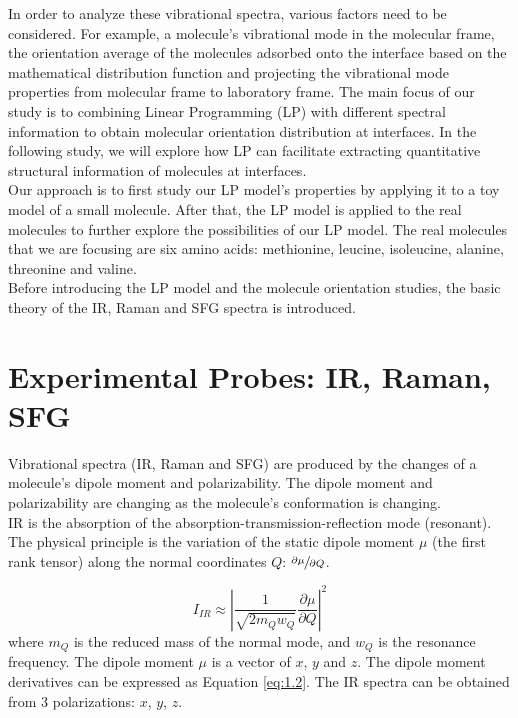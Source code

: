 In order to analyze these vibrational spectra, various factors need to be considered. For example, a molecule's vibrational mode in the molecular frame, the orientation average of the molecules adsorbed onto the interface based on the mathematical distribution function and projecting the vibrational mode properties from molecular frame to laboratory frame. The main focus of our study is to combining Linear Programming (LP) with different spectral information to obtain molecular orientation distribution at interfaces. In the following study, we will explore how LP can facilitate extracting quantitative structural information of molecules at interfaces.\\

Our approach is to first study our LP model's properties by applying it to a toy model of a small molecule. After that, the LP model is applied to the real molecules to further explore the possibilities of our LP model. The real molecules that we are focusing are six amino acids: methionine, leucine, isoleucine, alanine, threonine and valine.\\

Before introducing the LP model and the molecule orientation studies, the basic theory of  the IR, Raman and SFG spectra is introduced.\\

\section{Experimental Probes: IR, Raman, SFG}
Vibrational spectra (IR, Raman and SFG) are produced by the changes of a molecule's dipole moment and polarizability. The dipole moment and polarizability are changing as the molecule's conformation is changing. \\

IR is the absorption of the absorption-transmission-reflection mode (resonant). The physical principle is the variation of the static dipole moment $\mu$ (the first rank tensor) along the normal coordinates $Q$: $\sfrac{\partial\mu}{\partial Q}$. 

\begin{equation} \label{eq:1.1}
I_{IR} \approx \left| \frac{1}{\sqrt{2m_{Q}w_{Q}}} \frac{\partial\mu}{\partial Q} \right|^{2}
\end{equation}
where $m_{Q}$ is the reduced mass of the normal mode, and $w_{Q}$ is the resonance frequency. The dipole moment $\mu$ is a vector of $x$, $y$ and $z$. The dipole moment derivatives can be expressed as Equation \ref{eq:1.2}. The IR spectra can be obtained from 3 polarizations: $x$, $y$, $z$. 

